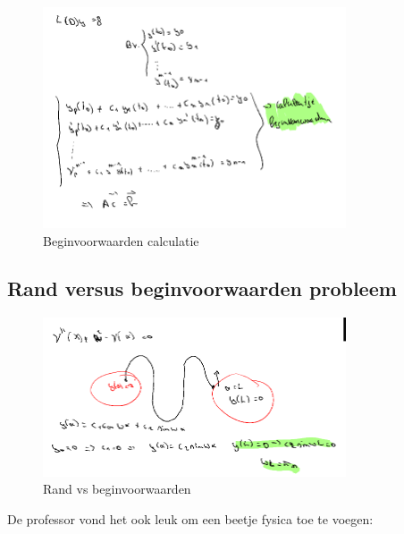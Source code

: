 \documentclass[a4paper]{report}
\begin{document}
\begin{figure}[H]
	\centering
	\includegraphics[width=0.8\textwidth]{assets/beginvoorwaarden_calculatie.png}
	\caption{Beginvoorwaarden calculatie}
	\label{fig:beginvoorwaarden_calculatie}
\end{figure}

\subsection{Rand versus beginvoorwaarden probleem}

\begin{figure}[H]
	\centering
	\includegraphics[width=0.8\textwidth]{assets/rand-vs-beginvoorwaarden.png}
	\caption{Rand vs beginvoorwaarden}
	\label{fig:rand-vs-beginvoorwaarden}
\end{figure}

De professor vond het ook leuk om een beetje fysica toe te voegen:
\end{document}
